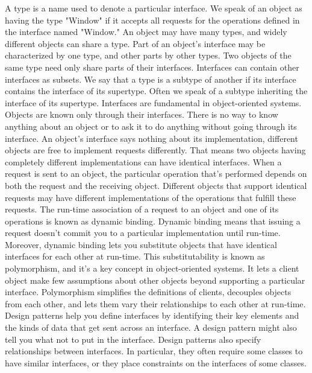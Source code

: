 \documentclass{report}
\begin{document}
\begin{itemize}
            \bigbreak \noindent 
            A type is a name used to denote a particular interface. We speak of an object as having the type "Window" if it accepts all requests for the operations defined in the interface named "Window." An object may have many types, and widely different objects can share a type. Part of an object's interface may be characterized by one type, and other parts by other types. Two objects of the same type need only share parts of their interfaces. Interfaces can contain other interfaces as subsets. We say that a type is a subtype of another if its interface contains the interface of its supertype. Often we speak of a subtype inheriting the interface of its supertype.
            \bigbreak \noindent 
            Interfaces are fundamental in object-oriented systems. Objects are known only through their interfaces. There is no way to know anything about an object or to ask it to do anything without going through its interface. An object's interface says nothing about its implementation, different objects are free to implement requests differently. That means two objects having completely different implementations can have identical interfaces.
            \bigbreak \noindent 
            When a request is sent to an object, the particular operation that's performed depends on both the request and the receiving object. Different objects that support identical requests may have different implementations of the operations that fulfill these requests. The run-time association of a request to an object and one of its operations is known as dynamic binding.
            \bigbreak \noindent 
            Dynamic binding means that issuing a request doesn't commit you to a particular implementation until run-time.
            \bigbreak \noindent 
            Moreover, dynamic binding lets you substitute objects that have identical interfaces for each other at run-time. This substitutability is known as polymorphism, and it's a key concept in object-oriented systems. It lets a client object make few assumptions about other objects beyond supporting a particular interface. Polymorphism simplifies the definitions of clients, decouples objects from each other, and lets them vary their relationships to each other at run-time.
            \bigbreak \noindent 
            Design patterns help you define interfaces by identifying their key elements and the kinds of data that get sent across an interface. A design pattern might also tell you what not to put in the interface.
            \bigbreak \noindent 
            Design patterns also specify relationships between interfaces. In particular, they often require some classes to have similar interfaces, or they place constraints on the interfaces of some classes.

\end{itemize}
\end{document}

